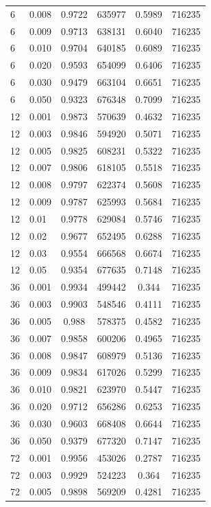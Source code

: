 \documentclass{article}
\begin{document}
\begin{longtable}[htbp]{l|l|*{4}{c}}
  6 & 0.008 & 0.9722 & 635977 & 0.5989 & 716235\\
  6 & 0.009 & 0.9713 & 638131 & 0.6040 & 716235\\
  6 & 0.010 & 0.9704 & 640185 & 0.6089 & 716235\\
  6 & 0.020 & 0.9593 & 654099 & 0.6406 & 716235\\
  6 & 0.030 & 0.9479 & 663104 & 0.6651 & 716235\\
  6 & 0.050 & 0.9323 & 676348 & 0.7099 & 716235\\
  12 & 0.001 & 0.9873 & 570639 & 0.4632 & 716235\\
  12 & 0.003 & 0.9846 & 594920 & 0.5071 & 716235\\
  12 & 0.005 & 0.9825 & 608231 & 0.5322 & 716235\\
  12 & 0.007 & 0.9806 & 618105 & 0.5518 & 716235\\
  12 & 0.008 & 0.9797 & 622374 & 0.5608 & 716235\\
  12 & 0.009 & 0.9787 & 625993 & 0.5684 & 716235\\
  12 & 0.01 & 0.9778 & 629084 & 0.5746 & 716235\\
  12 & 0.02 & 0.9677 & 652495 & 0.6288 & 716235\\
  12 & 0.03 & 0.9554 & 666568 & 0.6674 & 716235\\
  12 & 0.05 & 0.9354 & 677635 & 0.7148 & 716235\\
  36 & 0.001 & 0.9934 & 499442 & 0.344 & 716235\\
  36 & 0.003 & 0.9903 & 548546 & 0.4111 & 716235\\
  36 & 0.005 & 0.988 & 578375 & 0.4582 & 716235\\
  36 & 0.007 & 0.9858 & 600206 & 0.4965 & 716235\\
  36 & 0.008 & 0.9847 & 608979 & 0.5136 & 716235\\
  36 & 0.009 & 0.9834 & 617026 & 0.5299 & 716235\\
  36 & 0.010 & 0.9821 & 623970 & 0.5447 & 716235\\
  36 & 0.020 & 0.9712 & 656286 & 0.6253 & 716235\\
  36 & 0.030 & 0.9603 & 668408 & 0.6644 & 716235\\
  36 & 0.050 & 0.9379 & 677320 & 0.7147 & 716235\\
  72 & 0.001 & 0.9956 & 453026 & 0.2787 & 716235\\
  72 & 0.003 & 0.9929 & 524223 & 0.364 & 716235\\
  72 & 0.005 & 0.9898 & 569209 & 0.4281 & 716235\\

\end{longtable}
\end{document}

